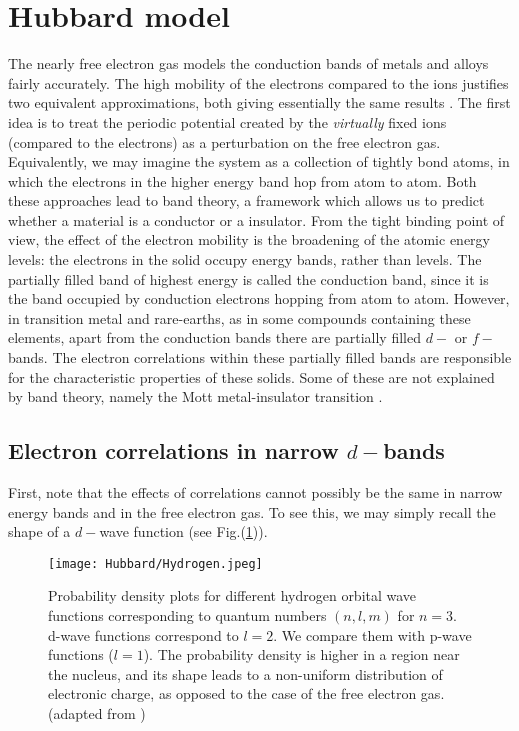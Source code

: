 \section{Hubbard model}\label{sec:hubbardModel}

The nearly free electron gas models the conduction bands of metals and alloys fairly accurately.
The high mobility of the electrons compared to the ions justifies two equivalent approximations, both giving essentially the same results \cite{ashcroft_solid_1976}.
The first idea is to treat the periodic potential created by the \emph{virtually} fixed ions (compared to the electrons) as a perturbation on the free electron gas.
Equivalently, we may imagine the system as a collection of tightly bond atoms, in which the electrons in the higher energy band hop from atom to atom.
Both these approaches lead to band theory, a framework which allows us to predict whether a material is a conductor or a insulator.
From the tight binding point of view, the effect of the electron mobility is the broadening of the atomic energy levels: the electrons in the solid occupy energy bands, rather than levels.
The partially filled band of highest energy is called the conduction band, since it is the band occupied by conduction electrons hopping from atom to atom.
However, in transition metal and rare-earths, as in some compounds containing these elements, apart from the conduction bands there are partially filled $d-$ or $f-$bands.
The electron correlations within these partially filled bands are responsible for the characteristic properties of these solids.
Some of these are not explained by band theory, namely the Mott metal-insulator transition \cite{h_de_boer_semiconductors_1937, mott_discussion_1937, mott_basis_1949}.

\subsection{Electron correlations in narrow $d-$bands}

First, note that the effects of correlations cannot possibly be the same in narrow energy bands and in the free electron gas.
To see this, we may simply recall the shape of a $d-$wave function (see Fig.(\ref{fig:hydrogenWF})).
\begin{figure}[H]
\centering
\texttt{[image: Hubbard/Hydrogen.jpeg]}
\caption[Hydrogen atomic wave functions.]{Probability density plots for different hydrogen orbital wave functions corresponding to quantum numbers $(n, l, m)$ for $n = 3$.
d-wave functions correspond to $l=2$.
We compare them with p-wave functions ($l=1$). The probability density is higher in a region near the nucleus, and its shape leads to a non-uniform distribution of electronic charge, as opposed to the case of the free electron gas.\label{fig:hydrogenWF} (adapted from \cite{hydrogen})}
\end{figure}

